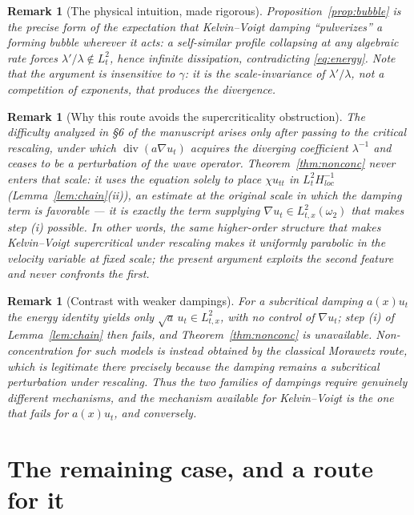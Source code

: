 \documentclass[11pt,letterpaper]{amsart}
\newtheorem{remark}[theorem]{Remark}
\newcommand{\dive}{\operatorname{div}}
\begin{document}
\begin{remark}[The physical intuition, made rigorous]
Proposition~\ref{prop:bubble} is the precise form of the expectation that Kelvin--Voigt damping
``pulverizes'' a forming bubble wherever it acts: a self-similar profile collapsing at
\emph{any} algebraic rate forces $\lambda'/\lambda\notin L^2_t$, hence infinite dissipation,
contradicting \eqref{eq:energy}. Note that the argument is insensitive to $\gamma$: it is the
scale-invariance of $\lambda'/\lambda$, not a competition of exponents, that produces the
divergence.
\end{remark}

\begin{remark}[Why this route avoids the supercriticality obstruction]\label{rem:bypass}
The difficulty analyzed in \S6 of the manuscript arises \emph{only} after passing to the critical
rescaling, under which $\dive(a\nabla u_t)$ acquires the diverging coefficient $\lambda^{-1}$ and
ceases to be a perturbation of the wave operator. Theorem~\ref{thm:nonconc} never enters that
scale: it uses the equation solely to place $\chi u_{tt}$ in $L^2_tH^{-1}_{loc}$
(Lemma~\ref{lem:chain}(ii)), an estimate at the original scale in which the damping term is
\emph{favorable} --- it is exactly the term supplying $\nabla u_t\in L^2_{t,x}(\omega_2)$ that
makes step (i) possible. In other words, the same higher-order structure that makes Kelvin--Voigt
supercritical under rescaling makes it \emph{uniformly parabolic} in the velocity variable at
fixed scale; the present argument exploits the second feature and never confronts the first.
\end{remark}

\begin{remark}[Contrast with weaker dampings]
For a subcritical damping $a(x)u_t$ the energy identity yields only $\sqrt a\,u_t\in L^2_{t,x}$,
with \emph{no} control of $\nabla u_t$; step (i) of Lemma~\ref{lem:chain} then fails, and
Theorem~\ref{thm:nonconc} is unavailable. Non-concentration for such models is instead obtained
by the classical Morawetz route, which is legitimate there precisely because the damping remains
a subcritical perturbation under rescaling. Thus the two families of dampings require genuinely
different mechanisms, and the mechanism available for Kelvin--Voigt is the one that fails for
$a(x)u_t$, and conversely.
\end{remark}

\section{The remaining case, and a route for it}
\end{document}
